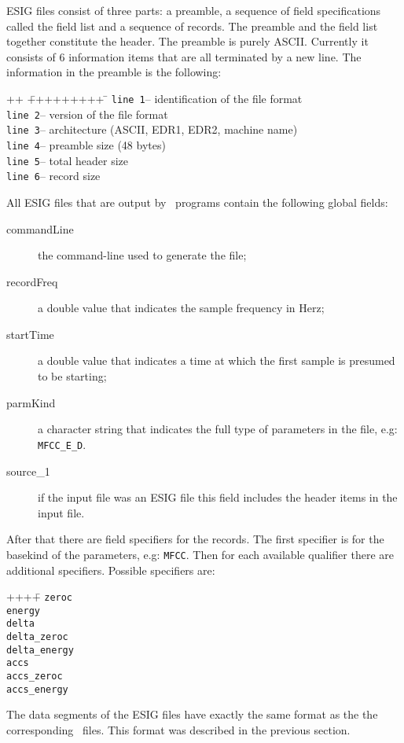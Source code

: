 ESIG files consist of three parts: a preamble, a sequence of field 
specifications called the field list and a sequence of records. The preamble
and the field list together constitute the header. The preamble is purely 
ASCII. Currently it consists of 6 information items that are all terminated
by a new line.  The information in the preamble is the following:
\begin{tabbing}
++ \= +++++++++ \= \kill
\>\texttt{line 1}\>-- identification of the file format \\
\>\texttt{line 2}\>-- version of the file format\\
\>\texttt{line 3}\>-- architecture (ASCII, EDR1, EDR2, machine name)\\
\>\texttt{line 4}\>-- preamble size (48 bytes)\\
\>\texttt{line 5}\>-- total header size\\
\>\texttt{line 6}\>-- record size\\
\end{tabbing}
All ESIG files that are output by \HTK\ programs contain the following 
global fields:
\begin{description}
  \item[commandLine] the command-line used to generate the file;
  \item[recordFreq] a double value that indicates the sample frequency
        in Herz;
  \item[startTime] a double value that indicates a time at which the first 
        sample is presumed to be starting;
  \item[parmKind] a character string that indicates the full 
        type of parameters in the file, e.g: \texttt{MFCC\_E\_D}.
  \item[source\_1] if the input file was an ESIG file this field includes the
        header items in the input file.
\end{description}
After that there are field specifiers for the records. The first specifier 
is for the  basekind of the parameters, e.g: \texttt{MFCC}. Then for each 
available qualifier there are additional specifiers. Possible specifiers are:
\begin{tabbing}
++++\=   \kill
\>\texttt{zeroc}  \\
\>\texttt{energy}\\
\>\texttt{delta}\\
\>\texttt{delta\_zeroc} \\
\>\texttt{delta\_energy}\\
\>\texttt{accs}\\
\>\texttt{accs\_zeroc} \\
\>\texttt{accs\_energy}\\
\end{tabbing}
The data segments of the ESIG files have exactly the same format as the
the corresponding \HTK\ files. This format was described in the previous 
section.

